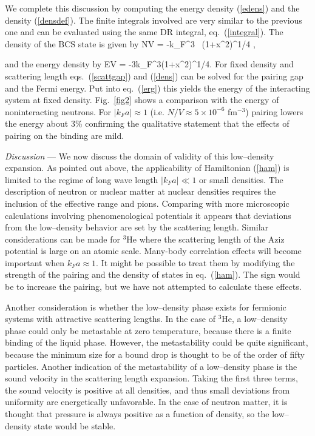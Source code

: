We complete this discussion by computing the energy density (\ref{edens}) and
the density (\ref{densdef}). The finite integrals involved are very similar 
to the previous one and can be evaluated using the same DR integral, 
eq.~(\ref{integral}). The density  of the BCS state is given by
\be
\label{dens}
{N\over V} = -{k_F^3 \pi}\, (1+x^2)^{1/4}
        ,  
\ee

and the energy density by
\be
\label{erg}
{E\over V} = -{3\pi}k_F^3\lambda (1+x^2)^{1/4}. 
\ee
For fixed density and scattering length eqs.~(\ref{scattgap}) and (\ref{dens})
can be solved for the pairing gap and the Fermi energy. Put into 
eq.~(\ref{erg}) this yields the energy of the interacting system at fixed 
density. Fig.~\ref{fig2} shows a comparison with the energy of 
noninteracting neutrons. For $|k_Fa|\approx 1$ 
(i.e. $N/V\approx 5\times 10^{-6}$ fm$^{-3}$) 
pairing lowers the energy about 3\% confirming the qualitative statement
that the effects of pairing on the binding are mild.



{\em Discussion} --- 
We now discuss the domain of validity of this low--density expansion. 
As pointed out above, the applicability of Hamiltonian (\ref{ham}) is limited 
to the regime of long wave length $|k_Fa|\ll 1$ or small densities. The 
description of neutron or nuclear matter at nuclear densities requires 
the inclusion of the effective range and pions. Comparing with more 
microscopic calculations involving phenomenological potentials it appears that
deviations from the low--density behavior are set by the scattering length.
Similar considerations can be made for $^3$He where the  
scattering length of the Aziz potential \cite{aziz79} is 
large on an atomic scale. Many-body correlation effects will become 
important when $k_F a \approx 1$.  It might be possible to treat them by 
modifying the strength of the pairing and the density of states in 
eq.~(\ref{ham}).
The sign would be to increase the pairing, but we have not attempted to 
calculate these effects.

Another consideration is whether the low--density phase exists for fermionic
systems with attractive scattering lengths.  In the case of $^3$He, a
low--density phase could only be metastable at zero temperature, because
there is a finite binding of the liquid phase.  However, the metastability
could be quite significant, because the minimum size for a bound drop
is thought to be of the order of fifty particles.  Another indication of
the metastability of a low--density phase is the sound velocity in the
scattering length expansion.  Taking the first three terms, the 
sound velocity is positive at all densities, and thus small deviations
from uniformity are energetically unfavorable.
In the case of neutron matter, it is thought that pressure is always
positive as a function of density, so the low--density state would be
stable.

